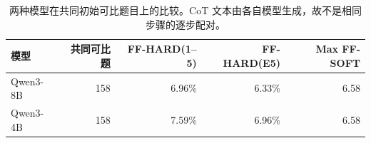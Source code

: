 \begin{table}[H]
\centering
\small
\caption{两种模型在共同初始可比题目上的比较。CoT 文本由各自模型生成，故不是相同步骤的逐步配对。}
\label{tab:paired}
\begin{tabular}{lrrrr}
\toprule
模型 & 共同可比题 & FF-HARD(1--5) & FF-HARD(E5) & Max FF-SOFT \\
\midrule
Qwen3-8B & 158 & 6.96\% & 6.33\% & 6.58 \\
Qwen3-4B & 158 & 7.59\% & 6.96\% & 6.58 \\
\bottomrule
\end{tabular}
\end{table}
